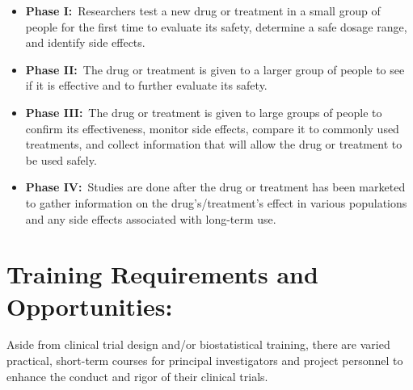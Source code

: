 \documentclass[]{book}
\theoremstyle{definition}
\theoremstyle{definition}
\theoremstyle{definition}
\theoremstyle{remark}
\begin{document}
\begin{itemize}
\item
  \textbf{Phase I:}~Researchers test a new drug or treatment in a small
  group of people for the first time to evaluate its safety, determine a
  safe dosage range, and identify side effects.
\item
  \textbf{Phase II:}~The drug or treatment is given to a larger group of
  people to see if it is effective and to further evaluate its safety.
\item
  \textbf{Phase III:}~The drug or treatment is given to large groups of
  people to confirm its effectiveness, monitor side effects, compare it
  to commonly used treatments, and collect information that will allow
  the drug or treatment to be used safely.
\item
  \textbf{Phase IV:}~Studies are done after the drug or treatment has
  been marketed to gather information on the drug's/treatment's effect
  in various populations and any side effects associated with long-term
  use.
\end{itemize}

\section{Training Requirements and
Opportunities:}\label{training-requirements-and-opportunities}

Aside from clinical trial design and/or biostatistical training, there
are varied practical, short-term courses for principal investigators and
project personnel to enhance the conduct and rigor of their clinical
trials.
\end{document}
